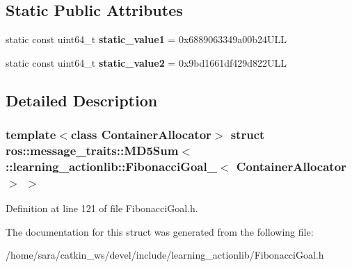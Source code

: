 \subsection*{Static Public Attributes}
\begin{DoxyCompactItemize}
\item 
\mbox{\label{structros_1_1message__traits_1_1MD5Sum_3_01_1_1learning__actionlib_1_1FibonacciGoal___3_01ContainerAllocator_01_4_01_4_ab48396c68d20a63bf458cfb029d08174}} 
static const uint64\+\_\+t {\bfseries static\+\_\+value1} = 0x6889063349a00b24\+U\+LL
\item 
\mbox{\label{structros_1_1message__traits_1_1MD5Sum_3_01_1_1learning__actionlib_1_1FibonacciGoal___3_01ContainerAllocator_01_4_01_4_a953e23a6e0e35a6601d8ef5a0d63daa6}} 
static const uint64\+\_\+t {\bfseries static\+\_\+value2} = 0x9bd1661df429d822\+U\+LL
\end{DoxyCompactItemize}


\subsection{Detailed Description}
\subsubsection*{template$<$class Container\+Allocator$>$\newline
struct ros\+::message\+\_\+traits\+::\+M\+D5\+Sum$<$ \+::learning\+\_\+actionlib\+::\+Fibonacci\+Goal\+\_\+$<$ Container\+Allocator $>$ $>$}



Definition at line 121 of file Fibonacci\+Goal.\+h.



The documentation for this struct was generated from the following file\+:\begin{DoxyCompactItemize}
\item 
/home/sara/catkin\+\_\+ws/devel/include/learning\+\_\+actionlib/Fibonacci\+Goal.\+h\end{DoxyCompactItemize}
